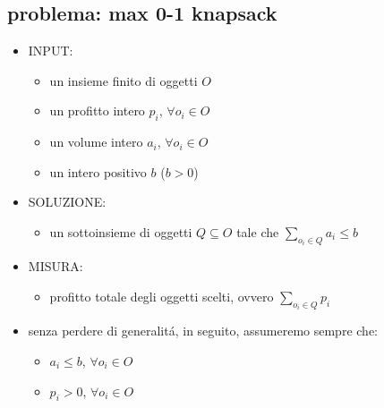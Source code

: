 \subsection*{problema: max 0-1 knapsack}
\begin{flushleft}
	\begin{itemize}
		\item INPUT:
		\begin{itemize}
			\item un insieme finito di oggetti $O$
			\item un profitto intero $p_i$, $\forall o_i\in O$
			\item un volume intero $a_i$, $\forall o_i\in O$
			\item un intero positivo $b$ ($b>0$)
		\end{itemize}
		\item SOLUZIONE:
		\begin{itemize}
			\item un sottoinsieme di oggetti $Q\subseteq O$ tale che $\sum_{o_i\in Q}a_i\leq b$
		\end{itemize}
		\item MISURA:
		\begin{itemize}
			\item profitto totale degli oggetti scelti, ovvero $\sum_{o_i\in Q}p_i$
		\end{itemize}
		\vspace{0.5cm}
		\item senza perdere di generalit\'a, in seguito, assumeremo sempre che:
		\begin{itemize}
			\item $a_i\leq b$, $\forall o_i\in O$
			\item $p_i>0$, $\forall o_i\in O$
		\end{itemize}
	\end{itemize}
\end{flushleft}


